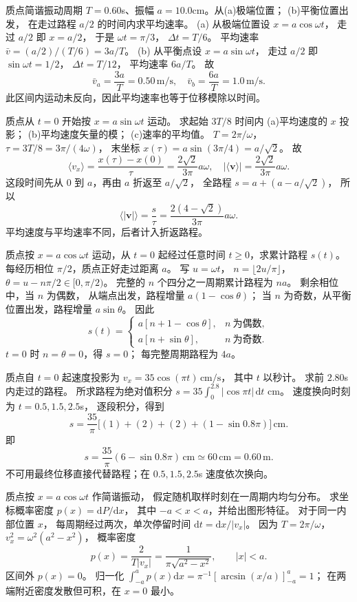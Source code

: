 质点简谐振动周期 $T=0.60$s、振幅
$a=10.0$cm。从(a)极端位置；
(b)平衡位置出发，
在走过路程 $a/2$ 的时间内求平均速率。
\exsolution
(a) 从极端位置设 $x=a\cos\omega t$，
走过 $a/2$ 即 $x=a/2$，
于是 $\omega t=\pi/3$，
$\Delta t=T/6$。
平均速率
$\bar v=(a/2)/(T/6)=3a/T$。
(b) 从平衡点设 $x=a\sin\omega t$，
走过 $a/2$ 即 $\sin\omega t=1/2$，
$\Delta t=T/12$，
平均速率 $6a/T$。
故
\[
\boxed{\bar v_a=\frac{3a}{T}=0.50\,\mathrm{m/s}},
\quad
\boxed{\bar v_b=\frac{6a}{T}=1.0\,\mathrm{m/s}}.
\]
\excheck 此区间内运动未反向，因此平均速率也等于位移模除以时间。

质点从 $t=0$ 开始按
$x=a\sin\omega t$ 运动。
求起始 $3T/8$ 时间内
(a)平均速度的 $x$ 投影；
(b)平均速度矢量的模；
(c)速率的平均值。
\exsolution
$T=2\pi/\omega$，
$\tau=3T/8=3\pi/(4\omega)$，
末坐标
$x(\tau)=a\sin(3\pi/4)=a/\sqrt2$。
故
\[
\boxed{\langle v_x\rangle=
\frac{x(\tau)-x(0)}{\tau}
=\frac{2\sqrt2}{3\pi}a\omega},
\quad
\boxed{|\langle\bm v\rangle|=
\frac{2\sqrt2}{3\pi}a\omega}.
\]
这段时间先从 $0$ 到 $a$，再由 $a$ 折返至 $a/\sqrt2$，
全路程 $s=a+(a-a/\sqrt2)$，
所以
\[
\boxed{\langle|\bm v|\rangle=
\frac{s}{\tau}=
\frac{2(4-\sqrt2)}{3\pi}a\omega}.
\]
\excheck 平均速度与平均速率不同，后者计入折返路程。

质点按 $x=a\cos\omega t$ 运动，从 $t=0$ 起经过任意时间 $t\ge0$，求累计路程 $s(t)$。
\exsolution
每经历相位 $\pi/2$，质点正好走过距离 $a$。
写 $u=\omega t$，
$n=\lfloor2u/\pi\rfloor$，
$\theta=u-n\pi/2\in[0,\pi/2)$。
完整的 $n$ 个四分之一周期累计路程为 $na$。
剩余相位中，当 $n$ 为偶数，
从端点出发，路程增量 $a(1-\cos\theta)$；
当 $n$ 为奇数，从平衡位置出发，路程增量 $a\sin\theta$。
因此
\[
\boxed{s(t)=
\begin{cases}
a[n+1-\cos\theta],&n\ \text{为偶数},\\
a[n+\sin\theta],&n\ \text{为奇数}.
\end{cases}}
\]
\excheck $t=0$ 时 $n=\theta=0$，得 $s=0$；
每完整周期路程为 $4a$。

质点自 $t=0$ 起速度投影为
$v_x=35\cos(\pi t)\,\mathrm{cm/s}$，
其中 $t$ 以秒计。
求前 $2.80$s 内走过的路程。
\exsolution
所求路程为绝对值积分
$s=35\int_0^{2.8}|\cos\pi t|\,\mathrm dt$ cm。
速度换向时刻为 $t=0.5,1.5,2.5$s，
逐段积分，得到
\[
s=\frac{35}{\pi}
\bigl[(1)+(2)+(2)+(1-\sin0.8\pi)\bigr]
\,\mathrm{cm}.
\]
即
\[
\boxed{s=\frac{35}{\pi}(6-\sin0.8\pi)
\,\mathrm{cm}\simeq60\,\mathrm{cm}=0.60\,\mathrm m}.
\]
\excheck 不可用最终位移直接代替路程；在 $0.5,1.5,2.5$s 速度依次换向。

质点按 $x=a\cos\omega t$ 作简谐振动，
假定随机取样时刻在一周期内均匀分布。
求坐标概率密度 $p(x)=\mathrm dP/\mathrm dx$，
其中 $-a<x<a$，并给出图形特征。
\exsolution
对于同一内部位置 $x$，
每周期经过两次，单次停留时间
$\mathrm dt=\mathrm dx/|v_x|$。
因为 $T=2\pi/\omega$，
$v_x^2=\omega^2(a^2-x^2)$，
概率密度
\[
p(x)=\frac{2}{T|v_x|}
=\boxed{\frac1{\pi\sqrt{a^2-x^2}}},\qquad |x|<a.
\]
区间外 $p(x)=0$。
\excheck 归一化
$\int_{-a}^ap(x)\mathrm dx
=\pi^{-1}[\arcsin(x/a)]_{-a}^{a}=1$；
在两端附近密度发散但可积，在 $x=0$ 最小。

